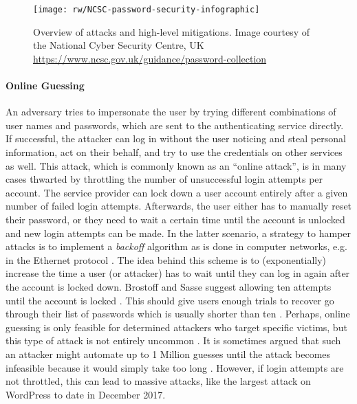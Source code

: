 \begin{figure}[h!]
	\centering
	\texttt{[image: rw/NCSC-password-security-infographic]}
	\caption{
		\label{fig:rw:attacks_infographic}
		Overview of attacks and high-level mitigations. Image courtesy of the National Cyber Security Centre, UK \protect\url{https://www.ncsc.gov.uk/guidance/password-collection} \protect{}
	}
\end{figure}


\paragraph{Online Guessing} 
An adversary tries to impersonate the user by trying different combinations of user names and passwords, which are sent to the authenticating service directly. If successful, the attacker can log in without the user noticing and steal personal information, act on their behalf, and try to use the credentials on other services as well. 
	This attack, which is commonly known as an ``online attack'', is in many cases thwarted by throttling the number of unsuccessful login attempts per account. The service provider can lock down a user account entirely after a given number of failed login attempts. Afterwards, the user either has to manually reset their password, or they need to wait a certain time until the account is unlocked and new login attempts can be made. In the latter scenario, a strategy to hamper attacks is to implement a \textit{backoff} algorithm as is done in computer networks, e.g. in the Ethernet protocol \cite[p. 285]{Tanenbaum2011ComputerNetworks}. The idea behind this scheme is to (exponentially) increase the time a user (or attacker) has to wait until they can log in again after the account is locked down. Brostoff and Sasse suggest allowing ten attempts until the account is locked \cite{Brostoff2003TenStrikes}. This should give users enough trials to recover go through their list of passwords which is usually shorter than ten \cite{Florencio2007LargeScaleStudyPasswordHabits}. 
Perhaps, online guessing is only feasible for determined attackers who target specific victims, but this type of attack is not entirely uncommon \cite{Florencio2013WhereDoAllTheAttacksGo, Florencio2014PasswordPortfoliosFiniteUser, Herley2015Counterfactuals, Wang2016TargetedGuessingUnderestimated}. It is sometimes argued that such an attacker might automate up to 1 Million guesses until the attack becomes infeasible because it would simply take too long \cite{Bonneau2015ImperfectAuthentication, Florencio2014AdministratorsGuide}. However, if login attempts are not throttled, this can lead to massive attacks, like the largest attack on WordPress to date in December 2017. 
